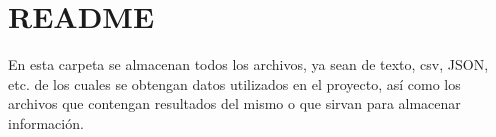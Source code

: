 \chapter{README}
\hypertarget{md__c_1_2_repositorio_t_i_f_2_software_2_trabajo_integrador_final___fisio_2data_2_r_e_a_d_m_e}{}\label{md__c_1_2_repositorio_t_i_f_2_software_2_trabajo_integrador_final___fisio_2data_2_r_e_a_d_m_e}
En esta carpeta se almacenan todos los archivos, ya sean de texto, csv, JSON, etc. de los cuales se obtengan datos utilizados en el proyecto, así como los archivos que contengan resultados del mismo o que sirvan para almacenar información. 